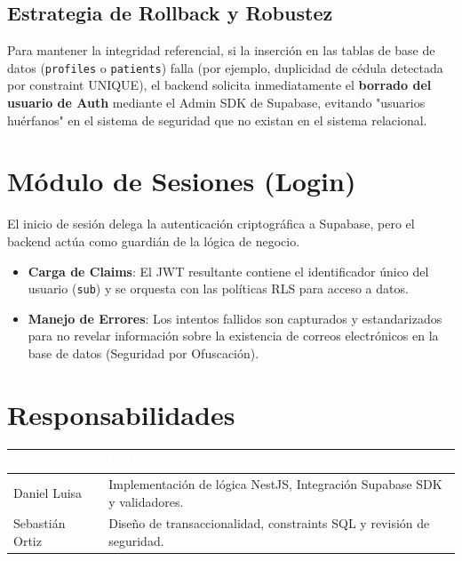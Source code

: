 \documentclass[a4paper,12pt]{article}
\renewcommand{\arraystretch}{1.1}
\begin{document}
    \subsection{Estrategia de Rollback y Robustez}
    Para mantener la integridad referencial, si la inserción en las tablas de base de datos (\texttt{profiles} o \texttt{patients}) falla (por ejemplo, duplicidad de cédula detectada por constraint UNIQUE), el backend solicita inmediatamente el \textbf{borrado del usuario de Auth} mediante el Admin SDK de Supabase, evitando "usuarios huérfanos" en el sistema de seguridad que no existan en el sistema relacional.

    \section{Módulo de Sesiones (Login)}

    El inicio de sesión delega la autenticación criptográfica a Supabase, pero el backend actúa como guardián de la lógica de negocio.

    \begin{itemize}
        \item \textbf{Carga de Claims}: El JWT resultante contiene el identificador único del usuario (\texttt{sub}) y se orquesta con las políticas RLS para acceso a datos.
        \item \textbf{Manejo de Errores}: Los intentos fallidos son capturados y estandarizados para no revelar información sobre la existencia de correos electrónicos en la base de datos (Seguridad por Ofuscación).
    \end{itemize}

    \section{Responsabilidades}

    \begin{table}[H]
    \centering\small\renewcommand{\arraystretch}{1.4}
    \begin{tabular}{|p{4.5cm}|p{9cm}|}
    \hline
    \rowcolor{SKTPrimary}
    \textcolor{white}{\textbf{Responsable}} & \textcolor{white}{\textbf{Rol en el Módulo}} \\
    \hline
    Daniel Luisa & Implementación de lógica NestJS, Integración Supabase SDK y validadores. \\
    \hline
    Sebastián Ortiz & Diseño de transaccionalidad, constraints SQL y revisión de seguridad. \\
    \hline
    \end{tabular}
    \end{table}
\end{document}
